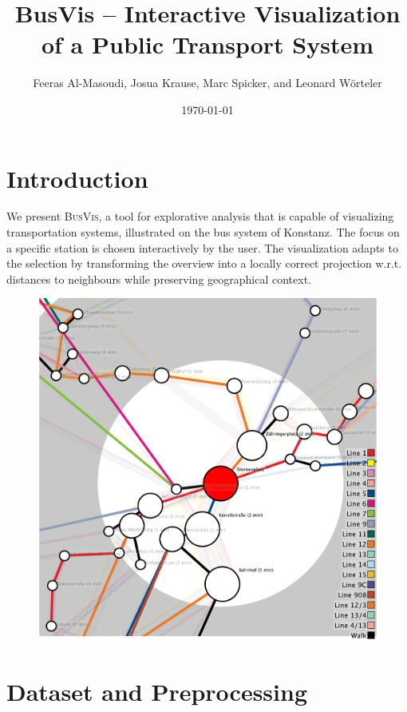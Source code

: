 \documentclass[a4paper, twocolumn,
final
]{article}
\title{BusVis -- Interactive Visualization of a Public Transport System}
\author{Feeras Al-Masoudi, Josua Krause,  Marc Spicker, and Leonard Wörteler  }
\date{\today}
\begin{document}

\maketitle
\thispagestyle{empty}

\section*{Introduction}
We present \textsc{BusVis}, a tool for explorative analysis that is capable of visualizing
transportation systems, illustrated on the bus system of Konstanz.
The focus on a specific station is chosen interactively by the user. The visualization adapts to the selection by transforming the overview into a locally correct projection w.r.t. distances to neighbours while preserving geographical context.

\begin{figure}[h]
	\centering
	\includegraphics[width=0.9\linewidth]{svgs/teaser.pdf}
\end{figure}

\section*{Dataset and Preprocessing}
\end{document}
